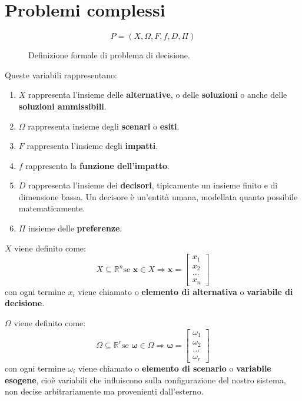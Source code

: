 \documentclass[\main/main.tex]{subfiles}
\begin{document}
\chapter{Problemi complessi}

\begin{figure}[H]
	\[
		P = (X, \Omega, F, f, D, \Pi)
	\]
	\caption{Definizione formale di problema di decisione.}
\end{figure}

Queste variabili rappresentano:

\begin{enumerate}
	\item $X$ rappresenta l'insieme delle \textbf{alternative}, o delle \textbf{soluzioni} o anche delle \textbf{soluzioni ammissibili}.
	\item $\Omega$ rappresenta insieme degli \textbf{scenari} o \textbf{esiti}.
	\item $F$ rappresenta l'insieme degli \textbf{impatti}.
	\item $f$ rappresenta la \textbf{funzione dell'impatto}.
	\item $D$ rappresenta l'insieme dei \textbf{decisori}, tipicamente un insieme finito e di dimensione bassa. Un decisore è un'entità umana, modellata quanto possibile matematicamente.
	\item $\Pi$ insieme delle \textbf{preferenze}.
\end{enumerate}

$X$ viene definito come: \[X \subseteq \mathbb{R}^n \text{se } \bm{x} \in X \Rightarrow \bm{x} = \begin{bmatrix}x_1\\x_2\\...\\x_n \end{bmatrix}\]
con ogni termine $x_i$ viene chiamato o \textbf{elemento di alternativa} o \textbf{variabile di decisione}.

$\Omega$ viene definito come: \[\Omega \subseteq \mathbb{R}^r \text{se } \bm{\omega} \in \Omega \Rightarrow \bm{\omega} = \begin{bmatrix}\omega_1\\\omega_2\\...\\\omega_r \end{bmatrix}\]
con ogni termine $\omega_i$ viene chiamato o \textbf{elemento di scenario} o \textbf{variabile esogene}, cioè variabili che influiscono sulla configurazione del nostro sistema, non decise arbitrariamente ma provenienti dall'esterno.
\end{document}
